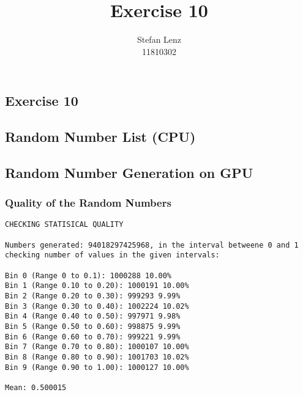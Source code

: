 \documentclass[12pt,a4paper]{article}
\title{Exercise 10}
\author{Stefan Lenz\\11810302}
\date{}
\begin{document}
\begin{center}
  \section*{Exercise 10}
\end{center}
\subsection*{Random Number List (CPU)}
\subsection*{Random Number Generation on GPU}
\subsubsection*{Quality of the Random Numbers}
\begin{lstlisting}
CHECKING STATISICAL QUALITY

Numbers generated: 94018297425968, in the interval betweene 0 and 1
checking number of values in the given intervals:

Bin 0 (Range 0 to 0.1): 1000288 10.00%
Bin 1 (Range 0.10 to 0.20): 1000191 10.00%
Bin 2 (Range 0.20 to 0.30): 999293 9.99%
Bin 3 (Range 0.30 to 0.40): 1002224 10.02%
Bin 4 (Range 0.40 to 0.50): 997971 9.98%
Bin 5 (Range 0.50 to 0.60): 998875 9.99%
Bin 6 (Range 0.60 to 0.70): 999221 9.99%
Bin 7 (Range 0.70 to 0.80): 1000107 10.00%
Bin 8 (Range 0.80 to 0.90): 1001703 10.02%
Bin 9 (Range 0.90 to 1.00): 1000127 10.00%

Mean: 0.500015
\end{lstlisting}
\end{document}

